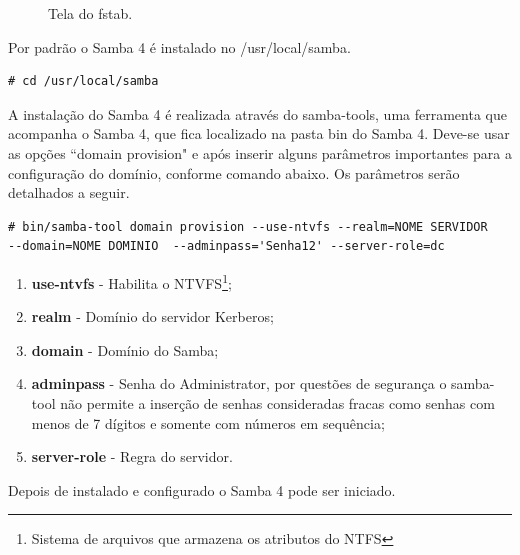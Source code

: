 \begin{figure}[ht]
   	\centering
   	\caption{Tela do fstab.}
    \label{fstab}
\end{figure}

\pagebreak

Por padrão o Samba 4 é instalado no /usr/local/samba.\\

\begin{lstlisting}
# cd /usr/local/samba
\end{lstlisting}

A instalação do Samba 4 é realizada através do samba-tools, uma ferramenta que acompanha o Samba 4, que fica localizado na pasta bin do Samba 4. Deve-se usar as opções ``domain provision" e após inserir alguns parâmetros importantes para a configuração do domínio, conforme comando abaixo. Os parâmetros serão detalhados a seguir.\\

\begin{lstlisting}
# bin/samba-tool domain provision --use-ntvfs --realm=NOME SERVIDOR
--domain=NOME DOMINIO  --adminpass='Senha12' --server-role=dc
\end{lstlisting}

\begin{enumerate}
	\item \textbf{use-ntvfs} - Habilita o NTVFS\footnote[3]{Sistema de arquivos que armazena os atributos do NTFS};
	\item \textbf{realm} - Domínio do servidor Kerberos;
	\item \textbf{domain} - Domínio do Samba;
	\item \textbf{adminpass} - Senha do Administrator, por questões de segurança o samba-tool não permite a inserção de senhas consideradas fracas como senhas com menos de 7 dígitos e somente com números em sequência;
	\item \textbf{server-role} - Regra do servidor.
\end{enumerate}

Depois de instalado e configurado o Samba 4 pode ser iniciado.\\

